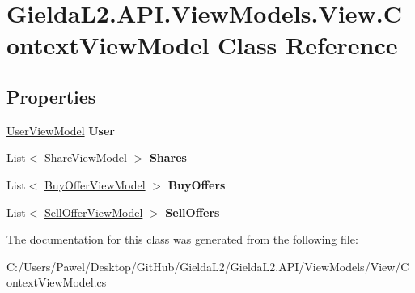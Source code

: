 \hypertarget{class_gielda_l2_1_1_a_p_i_1_1_view_models_1_1_view_1_1_context_view_model}{}\section{Gielda\+L2.\+A\+P\+I.\+View\+Models.\+View.\+Context\+View\+Model Class Reference}
\label{class_gielda_l2_1_1_a_p_i_1_1_view_models_1_1_view_1_1_context_view_model}
\subsection*{Properties}
\begin{DoxyCompactItemize}
\item 
\mbox{\label{class_gielda_l2_1_1_a_p_i_1_1_view_models_1_1_view_1_1_context_view_model_a830ea95c939f4b4274f840f847ce171d}} 
\mbox{\hyperlink{class_gielda_l2_1_1_a_p_i_1_1_view_models_1_1_view_1_1_user_view_model}{User\+View\+Model}} {\bfseries User}
\item 
\mbox{\label{class_gielda_l2_1_1_a_p_i_1_1_view_models_1_1_view_1_1_context_view_model_afb80b4db069f032667080ceb29792c7a}} 
List$<$ \mbox{\hyperlink{class_gielda_l2_1_1_a_p_i_1_1_view_models_1_1_view_1_1_share_view_model}{Share\+View\+Model}} $>$ {\bfseries Shares}
\item 
\mbox{\label{class_gielda_l2_1_1_a_p_i_1_1_view_models_1_1_view_1_1_context_view_model_a4355315c73ed90992fe2bbae00805f57}} 
List$<$ \mbox{\hyperlink{class_gielda_l2_1_1_a_p_i_1_1_view_models_1_1_view_1_1_buy_offer_view_model}{Buy\+Offer\+View\+Model}} $>$ {\bfseries Buy\+Offers}
\item 
\mbox{\label{class_gielda_l2_1_1_a_p_i_1_1_view_models_1_1_view_1_1_context_view_model_ad7ae767f1fbaf0e62a0c3759de470e49}} 
List$<$ \mbox{\hyperlink{class_gielda_l2_1_1_a_p_i_1_1_view_models_1_1_view_1_1_sell_offer_view_model}{Sell\+Offer\+View\+Model}} $>$ {\bfseries Sell\+Offers}
\end{DoxyCompactItemize}


The documentation for this class was generated from the following file\+:\begin{DoxyCompactItemize}
\item 
C\+:/\+Users/\+Pawel/\+Desktop/\+Git\+Hub/\+Gielda\+L2/\+Gielda\+L2.\+A\+P\+I/\+View\+Models/\+View/Context\+View\+Model.\+cs\end{DoxyCompactItemize}
